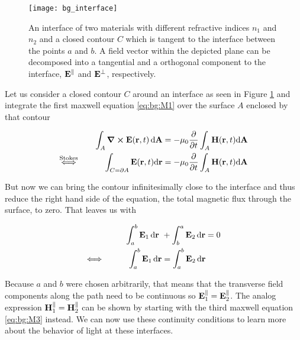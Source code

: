 \begin{figure}[H]
    \centering
    \texttt{[image: bg\_interface]}
    \caption{An interface of two materials with different refractive indices $n_1$ and $n_2$ and a closed contour $C$ which is tangent to the interface between the points $a$ and $b$. A field vector within the depicted plane can be decomposed into a tangential and a orthogonal component to the interface, 
    $\vb E^\parallel$ and $\vb E^\bot$, respectively.}
    \label{fig:bg:interface}
\end{figure}

Let us consider a closed contour $C$ around an interface as seen in Figure \ref{fig:bg:interface} and integrate the first maxwell equation \eqref{eq:bg:M1} over the surface $A$ enclosed by that contour

\begin{equation}
\begin{aligned}
    \int_A \curl \vb E(\vb r, t) \, \dd \vb A
    &= - \mu_0 \pdv t \int_A \vb H(\vb r, t) \dd \vb A\\
    \overset{\mathrm{Stokes}}{\Longleftrightarrow} \hspace{3em}
    \int_{C = \partial A} \vb E(\vb r, t) \dd \vb r
    &= - \mu_0 \pdv t \int_A \vb H(\vb r, t) \dd \vb A\\
\end{aligned}
\end{equation}

But now we can bring the contour infinitesimally close to the interface and thus reduce the right hand side of the equation, the total magnetic flux through the surface, to zero. That leaves us with

\begin{equation}
\begin{aligned}
    \int_a^b \vb E_1 \, \dd \vb r \ &+ \int_b^a \vb E_2 \,  \dd \vb r = 0\\
    \Longleftrightarrow \hspace{3em}
    \int_a^b \vb E_1 \, \dd \vb r &= \int_a^b \vb E_2 \,  \dd \vb r \\
\end{aligned}
\end{equation}

Because $a$ and $b$ were chosen arbitrarily, that means that the transverse field components along the path need to be continuous so
$\vb E_1^{\parallel} = \vb E_2^{\parallel}$.
The analog expression
$\vb H_1^{\parallel} = \vb H_2^{\parallel}$
can be shown by starting with the third maxwell equation \eqref{eq:bg:M3} instead. We can now use these continuity conditions to learn more about the behavior of light at these interfaces.

